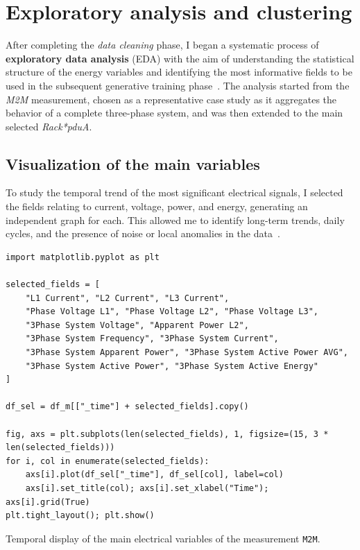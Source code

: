 
\section{Exploratory analysis and clustering}

After completing the \emph{data cleaning} phase, I began a systematic process of \textbf{exploratory data analysis} (EDA) with the aim of understanding the statistical structure of the energy variables and identifying the most informative fields to be used in the subsequent generative training phase~\cite{han2011data,bishop2006pattern,hastie2009elements}.  
The analysis started from the \emph{M2M} measurement, chosen as a representative case study as it aggregates the behavior of a complete three-phase system, and was then extended to the main selected \emph{Rack*pduA}.

\subsection{Visualization of the main variables}

To study the temporal trend of the most significant electrical signals, I selected the fields relating to current, voltage, power, and energy, generating an independent graph for each.  
This allowed me to identify long-term trends, daily cycles, and the presence of noise or local anomalies in the data~\cite{box2015time,shumway2017time}.

\begin{listing}[H]
\begin{verbatim}
import matplotlib.pyplot as plt

selected_fields = [
    "L1 Current", "L2 Current", "L3 Current",
    "Phase Voltage L1", "Phase Voltage L2", "Phase Voltage L3",
    "3Phase System Voltage", "Apparent Power L2",
    "3Phase System Frequency", "3Phase System Current",
    "3Phase System Apparent Power", "3Phase System Active Power AVG",
    "3Phase System Active Power", "3Phase System Active Energy"
]

df_sel = df_m[["_time"] + selected_fields].copy()

fig, axs = plt.subplots(len(selected_fields), 1, figsize=(15, 3 * len(selected_fields)))
for i, col in enumerate(selected_fields):
    axs[i].plot(df_sel["_time"], df_sel[col], label=col)
    axs[i].set_title(col); axs[i].set_xlabel("Time"); axs[i].grid(True)
plt.tight_layout(); plt.show()
\end{verbatim}
\caption{Temporal display of the main electrical variables of the measurement \texttt{M2M}.}
\end{listing}

